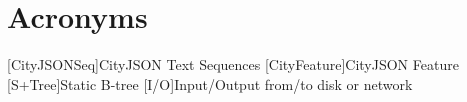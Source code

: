 
\chapter*{Acronyms}

\begin{acronym}[UML]
  [CityJSONSeq]{CityJSON Text Sequences}
  [CityFeature]{CityJSON Feature}
  [S+Tree]{Static B-tree}
  [I/O]{Input/Output from/to disk or network}
\end{acronym}